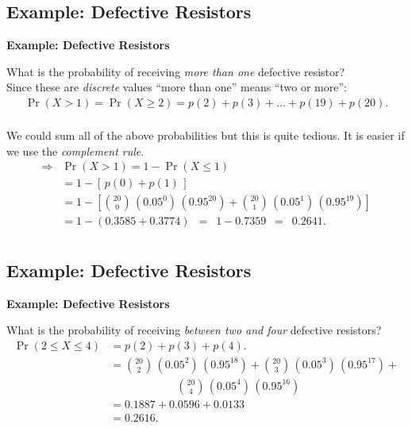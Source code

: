 \documentclass[compress]{beamer}        %
\makeatletter
\newcommand{\tcb}{\textcolor{beamer@blendedblue}}
\makeatother
\begin{document}
\subsection{Example: Defective Resistors}
\begin{frame}{\bf \tcb{Example: Defective Resistors}}

What is the probability of receiving \emph{more than one} defective resistor?\\[0.5cm]
Since these are \emph{discrete} values ``more than one'' means ``two or more'':
\begin{align*}
\Pr(X>1) = \Pr(X\ge2) = p(2) + p(3) + \ldots + p(19) + p(20).\\[-0.3cm]
\end{align*}

We could sum all of the above probabilities but this is quite tedious. It is easier if we use the \emph{complement rule}.\\[-0.2cm]
\begin{align*}
\Rightarrow &\Pr(X>1) = 1-\Pr(X\le1) \\&= 1 - [\,p(0) + p(1)\,] \\[0.3cm]
&= 1 - \left[\binom{20}{0}\,(0.05^{0})\,(0.95^{20}) +  \binom{20}{1}\,(0.05^{1})\,(0.95^{19}) \right]\\[0.3cm]
&= 1 - (0.3585 +  0.3774)\,\,\, =\,\,\,  1 - 0.7359 \,\,\,=\,\,\, 0.2641.\\
\end{align*}


\end{frame}


\subsection{Example: Defective Resistors}
\begin{frame}{\bf \tcb{Example: Defective Resistors}}\label{binexampleran}

What is the probability of receiving \emph{between two and four} defective resistors?
\begin{align*}
\Pr(2\le X \le 4) &= p(2) + p(3) + p(4).\\[0.3cm]
&= \binom{20}{2}\,(0.05^{2})\,(0.95^{18}) + \binom{20}{3}\,(0.05^{3})\,(0.95^{17}) + \\ &\qquad\qquad\qquad\binom{20}{4}\,(0.05^{4})\,(0.95^{16})\\[0.3cm]
&= 0.1887 + 0.0596 + 0.0133 \\[0.2cm]
&= 0.2616.
\end{align*}

\end{frame}
\end{document}
